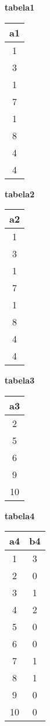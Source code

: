 \documentclass{article}
\begin{document}
\noindent
\begin{minipage}[t]{0.23\textwidth}
\centering
\textbf{tabela1} \\
\begin{tabular}{|c|}
\hline
a1 \\
\hline
1 \\
3 \\
1 \\
7 \\
1 \\
8 \\
4 \\
4 \\
\hline
\end{tabular}
\end{minipage}
\hfill
\begin{minipage}[t]{0.23\textwidth}
\centering
\textbf{tabela2} \\
\begin{tabular}{|c|}
\hline
a2 \\
\hline
1 \\
3 \\
1 \\
7 \\
1 \\
8 \\
4 \\
4 \\
\hline
\end{tabular}
\end{minipage}
\hfill
\begin{minipage}[t]{0.23\textwidth}
\centering
\textbf{tabela3} \\
\begin{tabular}{|c|}
\hline
a3 \\
\hline
2 \\
5 \\
6 \\
9 \\
10 \\
\hline
\end{tabular}
\end{minipage}
\hfill
\begin{minipage}[t]{0.23\textwidth}
\centering
\textbf{tabela4} \\
\begin{tabular}{|c|c|}
\hline
a4 & b4 \\
\hline
1 & 3 \\
2 & 0 \\
3 & 1 \\
4 & 2 \\
5 & 0 \\
6 & 0 \\
7 & 1 \\
8 & 1 \\
9 & 0 \\
10 & 0 \\
\hline
\end{tabular}
\end{minipage}
\end{document}

